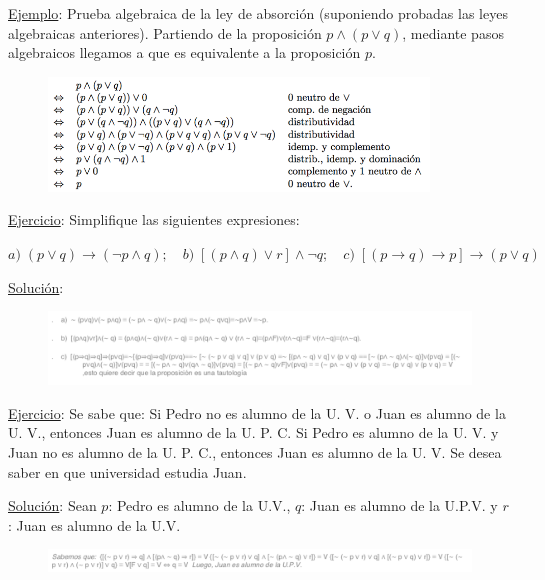 \underline{Ejemplo}: Prueba algebraica de la ley de absorción (suponiendo probadas las leyes algebraicas anteriores). Partiendo de la proposición $p \wedge (p \vee q)$, mediante pasos algebraicos llegamos a que es equivalente a la proposición $p$.

\begin{figure}[H] 
		\centering
		\includegraphics[width=0.9\textwidth]{imagenes/apendices/APENDICESIM29.png}
	\end{figure}


\underline{Ejercicio}:  Simplifique las siguientes expresiones:

$a)\;  (p \vee q) \to (\neg p \wedge q);\quad    b)\; [(p \wedge q) \vee r ]\wedge \neg q ;\quad   c)\; [(p \to q) \to p] \to (p \vee q) $

\textcolor{gris}{\underline{Solución}:}

\begin{figure}[H] 
		\centering
		\includegraphics[width=1.1\textwidth]{imagenes/apendices/APENDICESIM33.png}
	\end{figure} 

\underline{Ejercicio}:  Se sabe que:  Si Pedro no es alumno de la U. V. o Juan es alumno de la U. V., entonces Juan es alumno de la U. P. C.  Si Pedro es alumno de la U. V. y Juan no es alumno de la U. P. C., entonces Juan es alumno de la U. V.  Se desea saber en que universidad estudia Juan.

\textcolor{gris}{\underline{Solución}:  Sean $p$: Pedro es alumno de la U.V.,  $q$: Juan es alumno de la U.P.V. y  $r$: Juan es alumno de la U.V.}

\begin{figure}[H] 
		\centering
		\includegraphics[width=1.1\textwidth]{imagenes/apendices/APENDICESIM34.png}
	\end{figure} 

